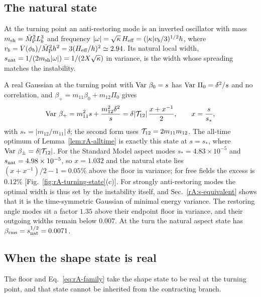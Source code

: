 \subsection{The natural state}
\label{rA:s-natural}

At the turning point an anti-restoring mode is an inverted oscillator with mass $m_{\rm sh}=\bar M_{\mathrm{P}}^2L_b^3$ and frequency $|\omega|=\sqrt{\kappa}\,H_{\mathrm{eff}}=(|\kappa|v_b/3)^{1/2}h$, where $v_b=V(\phi_b)/\bar M_{\mathrm{P}}^2h^2=3(H_{\mathrm{eff}}/h)^2\simeq2.94$. %
Its natural local width, $s_{\rm nat}=1/(2m_{\rm sh}|\omega|)=1/(2X\sqrt\kappa)$ in variance, is the width whose spreading matches the instability.

A real Gaussian at the turning point with $\operatorname{Var}\,\beta_0=s$ has $\operatorname{Var}\,\Pi_0=\delta^2/s$ and no correlation, and $\beta_+=m_{11}\beta_0+m_{12}\Pi_0$ gives
\begin{equation}
\operatorname{Var}\,\beta_+=m_{11}^2s+\frac{m_{12}^2\delta^2}{s}=\delta|\mathcal{T}_{12}|\,\frac{x+x^{-1}}2,\qquad x=\frac{s}{s_*},
\label{eq:rA-family}
\end{equation}
with $s_*=|m_{12}/m_{11}|\,\delta$; the second form uses $\mathcal{T}_{12}=2m_{11}m_{12}$.
The all-time optimum of Lemma~\ref{lem:rA-alltime} is exactly this state at $s=s_*$, where $\operatorname{Var}\,\beta_\pm=\delta|\mathcal{T}_{12}|$.
For the Standard Model aspect modes $s_*=4.83\times10^{-5}$ and $s_{\rm nat}=4.98\times10^{-5}$, so $x=1.032$ and the natural state lies $(x+x^{-1})/2-1=0.05\%$ above the floor in variance; for free fields the excess is $0.12\%$ [Fig.~\ref{fig:rA-turning-state}(c)]. %
For strongly anti-restoring modes the optimal width is thus set by the instability itself, and Sec.~\ref{rA:s-equivalent} shows that it is the time-symmetric Gaussian of minimal energy variance.
The restoring angle modes sit a factor $1.35$ above their endpoint floor in variance, and their outgoing widths remain below $0.007$. %
At the turn the natural aspect state has $\beta_{\rm rms}=s_{\rm nat}^{1/2}=0.0071$. %

\subsection{When the shape state is real}
\label{rA:s-theorem}

The floor and Eq.~\eqref{eq:rA-family} take the shape state to be real at the turning point, and that state cannot be inherited from the contracting branch.

